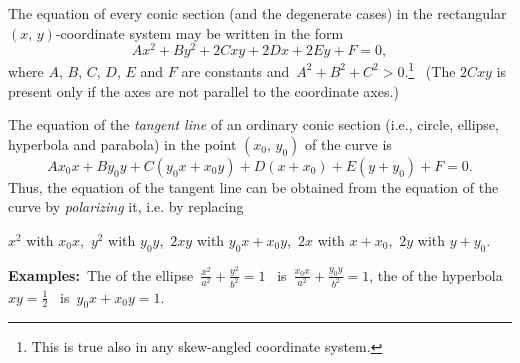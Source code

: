 \documentclass[12pt]{article}
\begin{document}
The equation of every conic section (and the degenerate cases) in the rectangular 
$(x,\,y)$-coordinate system may be written in the form
            $$Ax^2+By^2 +2Cxy+2Dx+2Ey+F = 0,$$
where $A$, $B$, $C$, $D$, $E$ and $F$ are constants and \,$A^2+B^2+C^2 > 0.$\footnote{This is true also in any skew-angled coordinate system.} \, (The  $2Cxy$ is present only if the  axes are not parallel to the coordinate axes.)

The equation of the {\em tangent line} of an ordinary conic section (i.e., circle, ellipse, hyperbola and parabola) in the point $(x_0,\,y_0)$ of the curve is
  $$Ax_0x+By_0y+C(y_0x+x_0y)+D(x+x_0)+E(y+y_0)+F = 0.$$
Thus, the equation of the tangent line can be obtained from the equation of the curve by {\em polarizing} it, i.e. by replacing 

\qquad $x^2$ with $x_0x$, \,$y^2$ with $y_0y$, \,$2xy$ with $y_0x+x_0y$, \,$2x$ with $x+x_0$, \,$2y$ with $y+y_0$.

\textbf{Examples:} \,The  of the ellipse \,$\frac{x^2}{a^2}+\frac{y^2}{b^2} = 1$ \, is \,$\frac{x_0x}{a^2}+\frac{y_0y}{b^2} = 1$, the  of the hyperbola \,$xy = \frac{1}{2}$ \, is \,$y_0x+x_0y = 1$.
\end{document}
